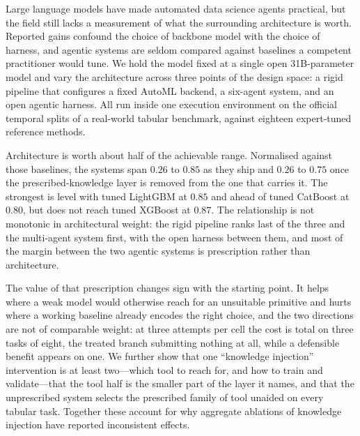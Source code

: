 Large language models have made automated data science agents practical, but the
field still lacks a measurement of what the surrounding architecture is worth.
Reported gains confound the choice of backbone model with the choice of harness,
and agentic systems are seldom compared against baselines a competent
practitioner would tune. We hold the model fixed at a single open 31B-parameter
model and vary the architecture across three points of the design space: a rigid
pipeline that configures a fixed AutoML backend, a six-agent system, and an open
agentic harness. All run inside one execution environment on the official
temporal splits of a real-world tabular benchmark, against eighteen expert-tuned
reference methods.

Architecture is worth about half of the achievable range. Normalised against
those baselines, the systems span $0.26$ to $0.85$ as they ship and $0.26$ to
$0.75$ once the prescribed-knowledge layer is removed from the one that carries
it. The strongest is level with tuned LightGBM at $0.85$ and ahead of tuned
CatBoost at $0.80$, but does not reach tuned XGBoost at $0.87$. The relationship
is not monotonic in architectural weight: the rigid pipeline ranks last of the
three and the multi-agent system first, with the open harness between them, and
most of the margin between the two agentic systems is prescription rather than
architecture.

The value of that prescription changes sign with the starting point. It helps
where a weak model would otherwise reach for an unsuitable primitive and hurts
where a working baseline already encodes the right choice, and the two directions
are not of comparable weight: at three attempts per cell the cost is total on
three tasks of eight, the treated branch submitting nothing at all, while a
defensible benefit appears on one. We further show that one ``knowledge
injection'' intervention is at least two---which tool to reach for, and how to
train and validate---that the tool half is the smaller part of the layer it
names, and that the unprescribed system selects the prescribed family of tool
unaided on every tabular task. Together these account for why aggregate
ablations of knowledge injection have reported inconsistent effects.
